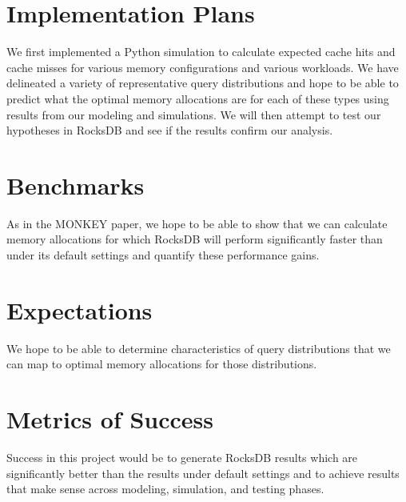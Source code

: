 \documentclass[11pt]{article}
\theoremstyle{plain}
\theoremstyle{definition}
\begin{document}
\section{Implementation Plans}
We first implemented a Python simulation to calculate expected cache hits and cache misses for various memory configurations and various workloads. We have delineated a variety of representative query distributions and hope to be able to predict what the optimal memory allocations are for each of these types using results from our modeling and simulations. We will then attempt to test our hypotheses in RocksDB and see if the results confirm our analysis. 

\section{Benchmarks}
As in the MONKEY paper, we hope to be able to show that we can calculate memory allocations for which RocksDB will perform significantly faster than under its default settings and quantify these performance gains. 

\section{Expectations}
We hope to be able to determine characteristics of query distributions that we can map to optimal memory allocations for those distributions.

\section{Metrics of Success}
Success in this project would be to generate RocksDB results which are significantly better than the results under default settings and to achieve results that make sense across modeling, simulation, and testing phases.
\end{document}
